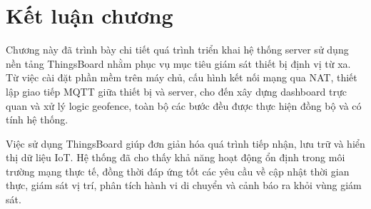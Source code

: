 \documentclass[../DoAn.tex]{subfiles}
\begin{document}
\section{Kết luận chương}
\label{section:5.5}
Chương này đã trình bày chi tiết quá trình triển khai hệ thống server sử dụng nền tảng ThingsBoard nhằm phục vụ mục tiêu giám sát thiết bị định vị từ xa. Từ việc cài đặt phần mềm trên máy chủ, cấu hình kết nối mạng qua NAT, thiết lập giao tiếp MQTT giữa thiết bị và server, cho đến xây dựng dashboard trực quan và xử lý logic geofence, toàn bộ các bước đều được thực hiện đồng bộ và có tính hệ thống.

Việc sử dụng ThingsBoard giúp đơn giản hóa quá trình tiếp nhận, lưu trữ và hiển thị dữ liệu IoT. Hệ thống đã cho thấy khả năng hoạt động ổn định trong môi trường mạng thực tế, đồng thời đáp ứng tốt các yêu cầu về cập nhật thời gian thực, giám sát vị trí, phân tích hành vi di chuyển và cảnh báo ra khỏi vùng giám sát.
\end{document}
